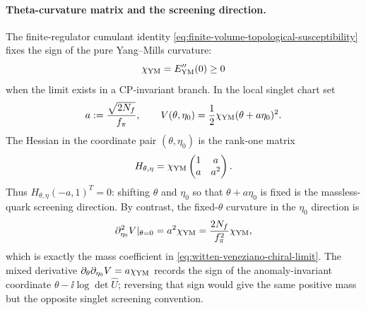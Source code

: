 \paragraph{Theta-curvature matrix and the screening direction.}
The finite-regulator cumulant identity
\eqref{eq:finite-volume-topological-susceptibility} fixes the sign of the
pure Yang--Mills curvature:
\[
  \chi_{\rm YM}=E_{\rm YM}''(0)\ge0
\]
when the limit exists in a CP-invariant branch.  In the local singlet chart set
\[
  a:=\frac{\sqrt{2N_f}}{f_\pi},
  \qquad
  V(\theta,\eta_0)
  =
  \frac12\chi_{\rm YM}(\theta+a\eta_0)^2 .
\]
The Hessian in the coordinate pair \((\theta,\eta_0)\) is the rank-one matrix
\begin{equation}
  H_{\theta,\eta}
  =
  \chi_{\rm YM}
  \begin{pmatrix}
    1&a\\
    a&a^2
  \end{pmatrix}.
  \label{eq:theta-eta0-curvature-matrix}
\end{equation}
Thus \(H_{\theta,\eta}(-a,1)^T=0\): shifting \(\theta\) and \(\eta_0\) so that
\(\theta+a\eta_0\) is fixed is the massless-quark screening direction.
By contrast, the fixed-\(\theta\) curvature in the \(\eta_0\) direction is
\[
  \partial_{\eta_0}^2V|_{\theta=0}
  =
  a^2\chi_{\rm YM}
  =
  \frac{2N_f}{f_\pi^2}\chi_{\rm YM},
\]
which is exactly the mass coefficient in
\eqref{eq:witten-veneziano-chiral-limit}.  The mixed derivative
\(\partial_\theta\partial_{\eta_0}V=a\chi_{\rm YM}\) records the sign of the
anomaly-invariant coordinate
\(\theta-\ii\log\det\widehat U\); reversing that sign would give the same
positive mass but the opposite singlet screening convention.

